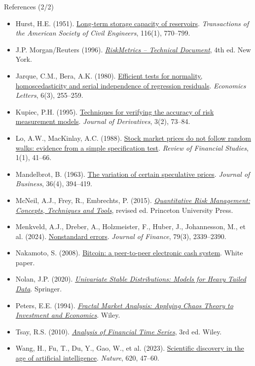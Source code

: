 \begin{frame}{References (2/2)}
\itemsize{\tiny}
\begin{itemize}
    \item Hurst, H.E. (1951). \href{https://doi.org/10.1061/TACEAT.0006518}{Long-term storage capacity of reservoirs}. \textit{Transactions of the American Society of Civil Engineers}, 116(1), 770--799.
    \item J.P. Morgan/Reuters (1996). \href{https://www.msci.com/documents/10199/5915b101-4206-4ba0-aee2-3449d5c7e95a}{\textit{RiskMetrics -- Technical Document}}, 4th ed. New York.
    \item Jarque, C.M., Bera, A.K. (1980). \href{https://doi.org/10.1016/0165-1765(80)90024-5}{Efficient tests for normality, homoscedasticity and serial independence of regression residuals}. \textit{Economics Letters}, 6(3), 255--259.
    \item Kupiec, P.H. (1995). \href{https://doi.org/10.3905/jod.1995.407942}{Techniques for verifying the accuracy of risk measurement models}. \textit{Journal of Derivatives}, 3(2), 73--84.
    \item Lo, A.W., MacKinlay, A.C. (1988). \href{https://doi.org/10.1093/rfs/1.1.41}{Stock market prices do not follow random walks: evidence from a simple specification test}. \textit{Review of Financial Studies}, 1(1), 41--66.
    \item Mandelbrot, B. (1963). \href{https://doi.org/10.1086/294632}{The variation of certain speculative prices}. \textit{Journal of Business}, 36(4), 394--419.
    \item McNeil, A.J., Frey, R., Embrechts, P. (2015). \href{https://press.princeton.edu/books/hardcover/9780691166278/quantitative-risk-management}{\textit{Quantitative Risk Management: Concepts, Techniques and Tools}}, revised ed. Princeton University Press.
    \item Menkveld, A.J., Dreber, A., Holzmeister, F., Huber, J., Johannesson, M., et al. (2024). \href{https://doi.org/10.1111/jofi.13337}{Nonstandard errors}. \textit{Journal of Finance}, 79(3), 2339--2390.
    \item Nakamoto, S. (2008). \href{https://bitcoin.org/bitcoin.pdf}{Bitcoin: a peer-to-peer electronic cash system}. White paper.
    \item Nolan, J.P. (2020). \href{https://doi.org/10.1007/978-3-030-52915-4}{\textit{Univariate Stable Distributions: Models for Heavy Tailed Data}}. Springer.
    \item Peters, E.E. (1994). \href{https://www.wiley.com/en-us/Fractal+Market+Analysis\%3A+Applying+Chaos+Theory+to+Investment+and+Economics-p-9780471585244}{\textit{Fractal Market Analysis: Applying Chaos Theory to Investment and Economics}}. Wiley.
    \item Tsay, R.S. (2010). \href{https://doi.org/10.1002/9780470644560}{\textit{Analysis of Financial Time Series}}, 3rd ed. Wiley.
    \item Wang, H., Fu, T., Du, Y., Gao, W., et al. (2023). \href{https://doi.org/10.1038/s41586-023-06221-2}{Scientific discovery in the age of artificial intelligence}. \textit{Nature}, 620, 47--60.
\end{itemize}
\end{frame}


